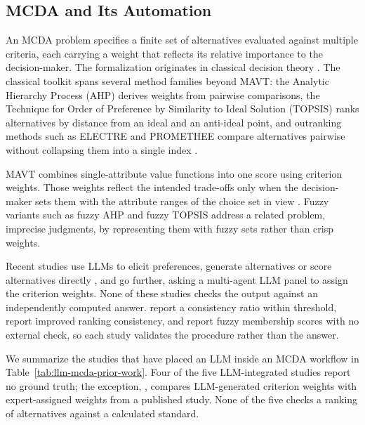 \documentclass[final,3p,times]{elsarticle}
\begin{document}
\subsection{MCDA and Its Automation}
\label{sec:lit-mcda}

An MCDA problem specifies a finite set of alternatives evaluated against multiple criteria, each carrying a weight that reflects its relative importance to the decision-maker. The formalization originates in classical decision theory \cite{keeneyraiffa1976,dyer1979}. The classical toolkit spans several method families beyond MAVT: the Analytic Hierarchy Process (AHP) derives weights from pairwise comparisons, the Technique for Order of Preference by Similarity to Ideal Solution (TOPSIS) ranks alternatives by distance from an ideal and an anti-ideal point, and outranking methods such as ELECTRE and PROMETHEE compare alternatives pairwise without collapsing them into a single index \cite{huang2011}.

MAVT combines single-attribute value functions into one score using criterion weights. Those weights reflect the intended trade-offs only when the decision-maker sets them with the attribute ranges of the choice set in view \cite{vonnitzsch1993}. Fuzzy variants such as fuzzy AHP and fuzzy TOPSIS address a related problem, imprecise judgments, by representing them with fuzzy sets \cite{zadeh1965} rather than crisp weights.

Recent studies use LLMs to elicit preferences, generate alternatives or score alternatives directly \cite{svoboda2024,icaart26}, and \citet{vahidnia2025walmas} go further, asking a multi-agent LLM panel to assign the criterion weights. None of these studies checks the output against an independently computed answer. \citet{svoboda2024} report a consistency ratio within threshold, \citet{icaart26} report improved ranking consistency, and \citet{anhao2025probid} report fuzzy membership scores with no external check, so each study validates the procedure rather than the answer.

We summarize the studies that have placed an LLM inside an MCDA workflow in Table~\ref{tab:llm-mcda-prior-work}. Four of the five LLM-integrated studies report no ground truth; the exception, \citet{cheng2026wildfire}, compares LLM-generated criterion weights with expert-assigned weights from a published study. None of the five checks a ranking of alternatives against a calculated standard.
\end{document}
